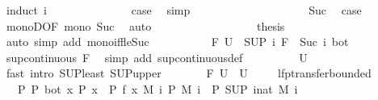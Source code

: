 \begin{isabellebody}
\ {\isacharparenleft}induct\ i{\isacharparenright}\isanewline
\ \ \ \ \ \ \ \ \ \ \isamarkupfalse%
\ {}\ \isamarkupfalse%
\ {\isacharquery}case\ \isamarkupfalse%
\ simp\isanewline
\ \ \ \ \ \ \ \ \isamarkupfalse%
\isanewline
\ \ \ \ \ \ \ \ \ \ \isamarkupfalse%
\ Suc\ \isamarkupfalse%
\ {\isacharquery}case\ \isamarkupfalse%
\ monoD{\isacharbrackleft}OF\ mono\ Suc{\isacharbrackright}\ \isamarkupfalse%
\ auto\isanewline
\ \ \ \ \ \ \ \ \isamarkupfalse%
\ \isacommand{{\isacharbraceright}}\isamarkupfalse%
\isanewline
\ \ \ \ \ \ \isamarkupfalse%
\ {\isacharquery}thesis\ \isamarkupfalse%
\ {\isacharparenleft}auto\ simp\ add{\isacharcolon}\ mono{\isacharunderscore}iff{\isacharunderscore}le{\isacharunderscore}Suc{\isacharparenright}\isanewline
\ \ \ \ \isamarkupfalse%
\isanewline
\ \ \ \ \isamarkupfalse%
\ {\isachardoublequoteopen}F\ {\isacharquery}U\ {\isacharequal}\ {\isacharparenleft}SUP\ i{\isachardot}\ {\isacharparenleft}F\ {\isacharcircum}{\isacharcircum}\ Suc\ i{\isacharparenright}\ bot{\isacharparenright}{\isachardoublequoteclose}\isanewline
\ \ \ \ \ \ \isamarkupfalse%
\ {\isacartoucheopen}sup{\isacharunderscore}continuous\ F{\isacartoucheclose}\ \isamarkupfalse%
\ {\isacharparenleft}simp\ add{\isacharcolon}\ sup{\isacharunderscore}continuous{\isacharunderscore}def{\isacharparenright}\isanewline
\ \ \ \ \isamarkupfalse%
\ \isamarkupfalse%
\ {\isachardoublequoteopen}{\isasymdots}\ {\isasymle}\ {\isacharquery}U{\isachardoublequoteclose}\isanewline
\ \ \ \ \ \ \isamarkupfalse%
\ {\isacharparenleft}fast\ intro{\isacharcolon}\ SUP{\isacharunderscore}least\ SUP{\isacharunderscore}upper{\isacharparenright}\isanewline
\ \ \ \ \isamarkupfalse%
\ \isamarkupfalse%
\ {\isachardoublequoteopen}F\ {\isacharquery}U\ {\isasymle}\ {\isacharquery}U{\isachardoublequoteclose}\ \isacommand{{\isachardot}}\isamarkupfalse%
\isanewline
\ \ \isamarkupfalse%
\isanewline
{}\isamarkupfalse%
%
\endisatagproof
{\isafoldproof}%
%
\isadelimproof
\isanewline
%
\endisadelimproof
\isanewline
{}\isamarkupfalse%
\ lfp{\isacharunderscore}transfer{\isacharunderscore}bounded{\isacharcolon}\isanewline
\ \ \ P{\isacharcolon}\ {\isachardoublequoteopen}P\ bot{\isachardoublequoteclose}\ {\isachardoublequoteopen}{\isasymAnd}x{\isachardot}\ P\ x\ {\isasymLongrightarrow}\ P\ {\isacharparenleft}f\ x{\isacharparenright}{\isachardoublequoteclose}\ {\isachardoublequoteopen}{\isasymAnd}M{\isachardot}\ {\isacharparenleft}{\isasymAnd}i{\isachardot}\ P\ {\isacharparenleft}M\ i{\isacharparenright}{\isacharparenright}\ {\isasymLongrightarrow}\ P\ {\isacharparenleft}SUP\ i{\isacharcolon}{\isacharcolon}nat{\isachardot}\ M\ i{\isacharparenright}{\isachardoublequoteclose}\isanewline

\end{isabellebody}
